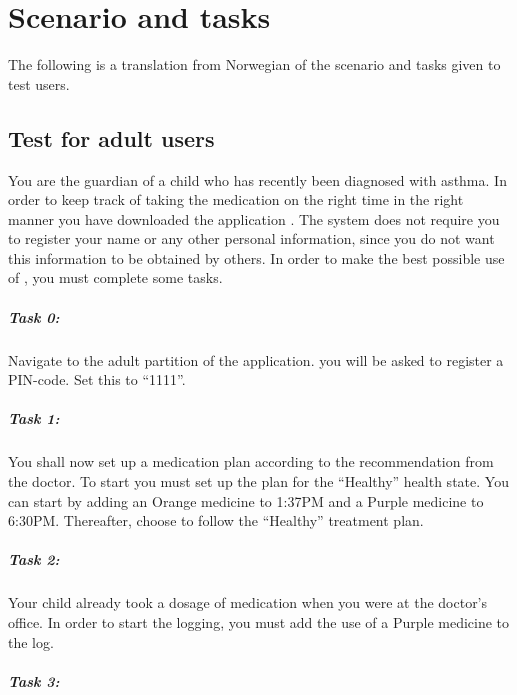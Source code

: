 \chapter{Scenario and tasks}
\label{app:scenarioandtasks}

The following is a translation from Norwegian of the scenario and tasks given to test users. 

\section{Test for adult users}
\label{sec:parentstest}
You are the guardian of a child who has recently been diagnosed with asthma. In order to keep track of taking the medication on the right time in the right manner you have downloaded the application \app{}. The system does not require you to register your name or any other personal information, since you do not want this information to be obtained by others. In order to make the best possible use of \app{}, you must complete some tasks. 

\paragraph{Task 0:}

Navigate to the adult partition of the application. you will be asked to register a PIN-code. Set this to ``1111''.


\paragraph{Task 1:}

You shall now set up a medication plan according to the recommendation from the doctor. To start you must set up the plan for the ``Healthy'' health state. You can start by adding an Orange medicine to 1:37PM and a Purple medicine to 6:30PM. Thereafter, choose to follow the ``Healthy'' treatment plan.


\paragraph{Task 2:}

Your child already took a dosage of medication when you were at the doctor's office. In order to start the logging, you must add the use of a Purple medicine to the log. 


\paragraph{Task 3:}

